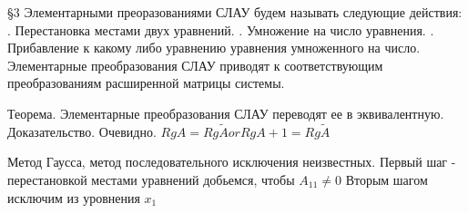 \documentclass[12pt]{article}
\begin{document}
    \S3 \newline
    Элементарными преоразованиями СЛАУ будем называть следующие действия: . Перестановка местами двух уравнений. . Умножение на число уравнения. . Прибавление к какому либо  уравнению уравнения умноженного на число. \newline
    Элементарные преобразования СЛАУ приводят к соответствующим преобразованиям расширенной матрицы системы. \newline

    Теорема. Элементарные преобразования СЛАУ переводят ее в эквивалентную. \newline
    Доказательство. Очевидно. \newline
    $Rg A = Rg \tilde A or Rg A + 1 = Rg \tilde A$ \newline

    Метод Гаусса, метод последовательного исключения неизвестных. \newline
    Первый шаг - перестановкой местами уравнений добьемся, чтобы $A_{11} \not = 0$ \newline
    Вторым шагом исключим из уровнения $x_1$ \newline
\end{document}
